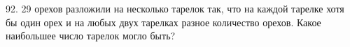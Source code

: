 92. 29 орехов разложили на несколько тарелок так, что на каждой тарелке хотя бы один орех и на любых двух тарелках разное количество орехов. Какое наибольшее число тарелок могло быть?\\
